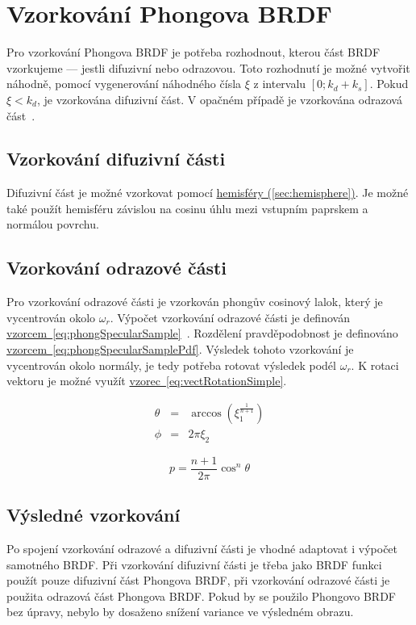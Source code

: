 \documentclass[czech,master]{diploma}
\newcommand{\interval}[1]{\left[{#1}\right]}
\newcommand{\refl}{\omega_{r}}
\newcommand{\randU}{\xi_{1}}
\newcommand{\randV}{\xi_{2}}
\begin{document}
\section{Vzorkování Phongova BRDF} \label{sec:phongSampling}
Pro vzorkování Phongova BRDF je potřeba rozhodnout, kterou část BRDF vzorkujeme --- jestli difuzivní nebo odrazovou. Toto rozhodnutí je možné vytvořit náhodně, pomocí vygenerování náhodného čísla \(\xi\) z intervalu \(\interval{0;k_d+k_s}\). Pokud \(\xi < k_d\), je vzorkována difuzivní část. V opačném případě je vzorkována odrazová část~\cite{KrivanekBRDFIBL}.
\subsection{Vzorkování difuzivní části}
Difuzivní část je možné vzorkovat pomocí \hyperref[sec:hemisphere]{hemisféry (\ref{sec:hemisphere})}. Je možné také použít hemisféru závislou na cosinu úhlu mezi vstupním paprskem a normálou povrchu.

\subsection{Vzorkování odrazové části}
Pro vzorkování odrazové části je vzorkován phongův cosinový lalok, který je vycentrován okolo \(\refl\). Výpočet vzorkování odrazové části je definován \hyperref[eq:phongSpecularSample]{vzorcem~\ref{eq:phongSpecularSample}}~\cite{KrivanekBRDFIBL}. Rozdělení pravděpodobnost je definováno \hyperref[eq:phongSpecularSamplePdf]{vzorcem~\ref{eq:phongSpecularSamplePdf}}.
Výsledek tohoto vzorkování je vycentrován okolo normály, je tedy potřeba rotovat výsledek podél \(\refl\). K rotaci vektoru je možné využít \hyperref[eq:vectRotationSimple]{vzorec~\ref{eq:vectRotationSimple}}.

\begin{eqnarray}
  \theta & = & \arccos(\randU^{\frac{1}{n+1}}) \nonumber \\
  \phi & = & 2\pi\randV\label{eq:phongSpecularSample}
\end{eqnarray}

\begin{equation} \label{eq:phongSpecularSamplePdf}
  p = \frac{n+1}{2\pi}\cos^n\theta
\end{equation}

\subsection{Výsledné vzorkování}
Po spojení vzorkování odrazové a difuzivní části je vhodné adaptovat i výpočet samotného BRDF\@. Při vzorkování difuzivní části je třeba jako BRDF funkci použít pouze difuzivní část Phongova BRDF, při vzorkování odrazové části je použita odrazová část Phongova BRDF\@. Pokud by se použilo Phongovo BRDF bez úpravy, nebylo by dosaženo snížení variance ve výsledném obrazu.~\cite{KrivanekBRDFIBL}
\end{document}
